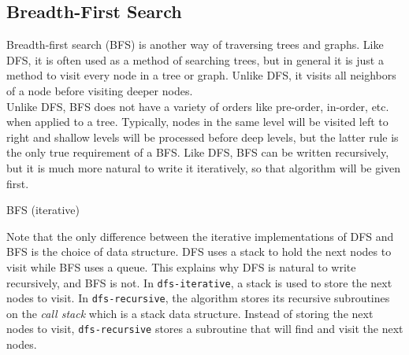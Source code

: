 
\subsection{Breadth-First Search}

Breadth-first search (BFS) is another way of traversing trees and graphs. Like DFS, it is often used as a method of searching trees, but in general it is just a method to visit every node in a tree or graph. Unlike DFS, it visits all neighbors of a node before visiting deeper nodes. \\

Unlike DFS, BFS does not have a variety of orders like pre-order, in-order, etc. when applied to a tree. Typically, nodes in the same level will be visited left to right and shallow levels will be processed before deep levels, but the latter rule is the only true requirement of a BFS. Like DFS, BFS can be written recursively, but it is much more natural to write it iteratively, so that algorithm will be given first. \\

\begin{algorithm}[H]
	\caption{BFS (iterative)}
\end{algorithm}
\vspace{5mm}

Note that the only difference between the iterative implementations of DFS and BFS is the choice of data structure. DFS uses a stack to hold the next nodes to visit while BFS uses a queue. This explains why DFS is natural to write recursively, and BFS is not. In \texttt{dfs-iterative}, a stack is used to store the next nodes to visit. In \texttt{dfs-recursive}, the algorithm stores its recursive subroutines on the \textit{call stack} which is a stack data structure. Instead of storing the next nodes to visit, \texttt{dfs-recursive} stores a subroutine that will find and visit the next nodes. \\


